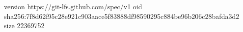 version https://git-lfs.github.com/spec/v1
oid sha256:7f8d62f95c28e921c903aace5f83888df98590295c884be96b206c28bafda3d2
size 22369752
